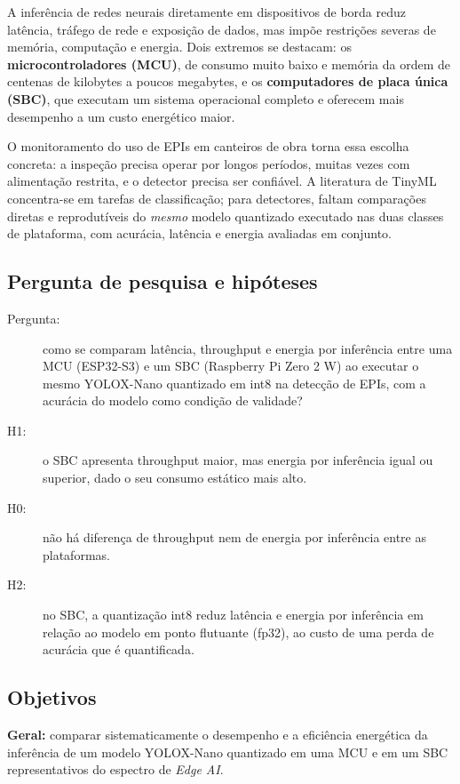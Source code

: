 \documentclass[11pt,a4paper]{article}
\begin{document}
A inferência de redes neurais diretamente em dispositivos de borda reduz latência, tráfego de rede e
exposição de dados, mas impõe restrições severas de memória, computação e energia. Dois extremos se
destacam: os \textbf{microcontroladores (MCU)}, de consumo muito baixo e memória da ordem de centenas de
kilobytes a poucos megabytes, e os \textbf{computadores de placa única (SBC)}, que executam um sistema
operacional completo e oferecem mais desempenho a um custo energético maior.

O monitoramento do uso de EPIs em canteiros de obra torna essa escolha concreta: a inspeção precisa operar
por longos períodos, muitas vezes com alimentação restrita, e o detector precisa ser confiável. A literatura de
TinyML concentra-se em tarefas de classificação; para detectores, faltam comparações diretas e
reprodutíveis do \emph{mesmo} modelo quantizado executado nas duas classes de plataforma, com acurácia,
latência e energia avaliadas em conjunto.

\subsection{Pergunta de pesquisa e hipóteses}
\begin{description}
\item[Pergunta:] como se comparam latência, throughput e energia por inferência entre uma MCU (ESP32-S3) e um
SBC (Raspberry Pi Zero 2 W) ao executar o mesmo YOLOX-Nano quantizado em int8 na detecção de EPIs, com a
acurácia do modelo como condição de validade?
\item[H1:] o SBC apresenta throughput maior, mas energia por inferência igual ou superior, dado o seu
consumo estático mais alto.
\item[H0:] não há diferença de throughput nem de energia por inferência entre as plataformas.
\item[H2:] no SBC, a quantização int8 reduz latência e energia por inferência em relação ao modelo em ponto
flutuante (fp32), ao custo de uma perda de acurácia que é quantificada.
\end{description}

\subsection{Objetivos}
\textbf{Geral:} comparar sistematicamente o desempenho e a eficiência energética da inferência de um modelo
YOLOX-Nano quantizado em uma MCU e em um SBC representativos do espectro de \emph{Edge AI}.
\end{document}
